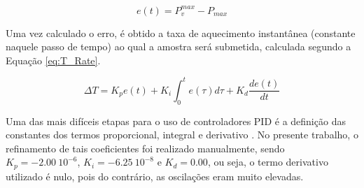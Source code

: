 \begin{equation}
  \label{eq:erro_pid}
  e(t) = P_v^{max} - P_{max}
\end{equation}

Uma vez calculado o erro, é obtido a taxa de aquecimento instantânea (constante
naquele passo de tempo) ao qual a amostra será submetida, calculada segundo a
Equação \ref{eq:T_Rate}.

\begin{equation}
  \label{eq:T_Rate}
  \Delta T = K_{p} e(t)+K_{i} \int_{0}^{t} e(\tau) d \tau+K_{d} \frac{d e(t)}{d t}
\end{equation}

Uma das mais difíceis etapas para o uso de controladores PID é a definição das
constantes dos termos proporcional, integral e derivativo \cite{ogata2002}. No
presente trabalho, o refinamento de tais coeficientes foi realizado manualmente,
sendo $K_p = - 2.00 \ 10^{-6}$, $K_i= -6.25 \ 10^{-8}$ e $K_d = 0.00$, ou seja,
o termo derivativo utilizado é nulo, pois do contrário, as oscilações eram muito
elevadas.
 
  
